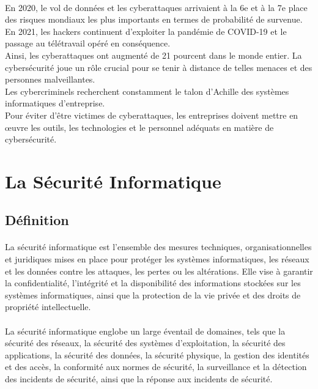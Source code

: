  \paragraph*{ }
 En 2020, le vol de données et les cyberattaques arrivaient à la 6e et à la 7e place des risques mondiaux les plus importants en termes de probabilité de survenue.\\ En 2021, les hackers continuent d’exploiter la pandémie de COVID-19 et le passage au télétravail opéré en conséquence.\\ Ainsi, les cyberattaques ont augmenté de 21 pourcent dans le monde entier. La cybersécurité joue un rôle crucial pour se tenir à distance de telles menaces et des personnes malveillantes.\\
 
 Les cybercriminels recherchent constamment le talon d’Achille des systèmes informatiques d’entreprise.\\ Pour éviter d’être victimes de cyberattaques, les entreprises doivent mettre en œuvre les outils, les technologies et le personnel adéquats en matière de cybersécurité.\\
\section{La Sécurité Informatique }
\subsection{Définition}
  


\paragraph{ }  La sécurité informatique est l'ensemble des mesures techniques, organisationnelles et juridiques mises en place pour protéger les systèmes informatiques, les réseaux et les données contre les attaques, les pertes ou les altérations. Elle vise à garantir la confidentialité, l'intégrité et la disponibilité des informations stockées sur les systèmes informatiques, ainsi que la protection de la vie privée et des droits de propriété intellectuelle.  

\paragraph{ } La sécurité informatique englobe un large éventail de domaines, tels que la sécurité des réseaux, la sécurité des systèmes d'exploitation, la sécurité des applications, la sécurité des données, la sécurité physique, la gestion des identités et des accès, la conformité aux normes de sécurité, la surveillance et la détection des incidents de sécurité, ainsi que la réponse aux incidents de sécurité.

